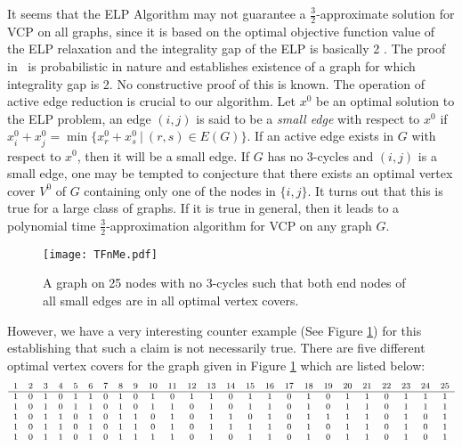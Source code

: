 \documentclass[12pt]{article}
\begin{document}
It seems that the ELP Algorithm may not guarantee a $\frac 3
2$-approximate solution for VCP on all graphs, since it is based on
the optimal objective function value of the ELP relaxation and the
integrality gap of the ELP is basically 2 \cite{arora}. The proof
in~\cite{arora} is probabilistic in nature and establishes existence
of a graph for which integrality gap is 2. No constructive proof of
this is known. The operation of active edge reduction is crucial to
our algorithm. Let $x^0$ be an optimal solution to the ELP problem,
an edge $(i, j)$ is said to be a {\it small edge} with respect to
$x^0$ if $x_i^0+x_j^0=\min\{x_r^0+x_s^0\ |\ (r, s) \in E(G)\}$. If
an active edge exists in $G$ with respect to $x^0$, then it will be
a small edge.
If $G$ has no 3-cycles and $(i,j)$ is a small edge, one may be tempted to
conjecture that
 there exists an optimal vertex cover $V^0$ of $G$ containing
only one of the nodes in $\{i,j\}$. It turns out that this is true
for a large class of graphs. If it is true in general, then it leads
to a polynomial time $\frac 3 2$-approximation algorithm  for VCP on
any graph $G$.

\begin{figure}\begin{center}
\texttt{[image: TFnMe.pdf]}
  \caption{A graph  on 25 nodes with no 3-cycles such that both end nodes of all small edges
   are in all optimal vertex covers.}
  \label{fig2}
\end{center}\end{figure}
However, we have a very interesting counter example (See Figure
\ref{fig2}) for this establishing that such a claim is not
necessarily true. There are  five different optimal vertex covers
for the graph given in Figure \ref{fig2} which are listed below:
\[{\footnotesize
\begin{array}{ccccccccccccccccccccccccc}
  1 & 2& 3& 4& 5& 6& 7& 8& 9& 10 &11& 12& 13& 14 &15& 16& 17& 18& 19& 20& 21& 22& 23& 24& 25 \\ \hline
     1 & 0 & 1 & 0 & 1 & 1 & 0 & 1 & 0 & 1 & 0 & 1 & 1 & 0 & 1 & 1 & 0 & 1 & 0 & 1 & 1 & 0 & 1 & 1 & 1\\
     1 & 0 & 1 & 0 & 1 & 1 & 0 & 1 & 0 & 1 & 1 & 0 & 1 & 0 & 1 & 1 & 0 & 1 & 0 & 1 & 1 & 0 & 1 & 1 & 1\\
     1 & 0 & 1 & 1 & 0 & 1 & 0 & 1 & 1 & 0 & 1 & 0 & 1 & 1 & 0 & 1 & 0 & 1 & 1 & 1 & 1 & 0 & 1 & 0 & 1\\
     1 & 0 & 1 & 1 & 0 & 1 & 0 & 1 & 1 & 0 & 1 & 0 & 1 & 1 & 1 & 1 & 0 & 1 & 0 & 1 & 1 & 0 & 1 & 0 & 1\\
     1 & 0 & 1 & 1 & 0 & 1 & 0 & 1 & 1 & 1 & 1 & 0 & 1 & 0 & 1 & 1 & 0 & 1 & 0 & 1 & 1 & 0 & 1 & 0 & 1
\end{array}}
\]
\end{document}
